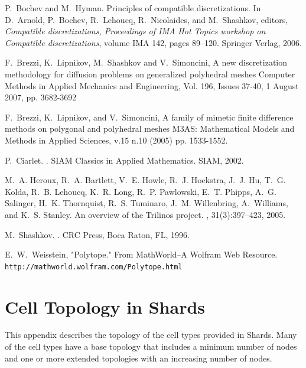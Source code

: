 \documentclass[pdf,12pt,relaxed]{SANDreport}
\begin{document}
\begin{thebibliography}{99}

P.~Bochev and M.~Hyman.
\newblock Principles of compatible discretizations.
\newblock In D.~Arnold, P.~Bochev, R.~Lehoucq, R.~Nicolaides, and M.~Shashkov,
  editors, {\em Compatible discretizations, Proceedings of IMA Hot Topics
  workshop on Compatible discretizations}, volume IMA 142, pages 89--120.
  Springer Verlag, 2006.


 F.~Brezzi, K.~Lipnikov, M.~Shashkov and V.~Simoncini,
\newblock A new discretization methodology for diffusion problems on generalized polyhedral meshes
Computer Methods in Applied Mechanics and Engineering, Vol. 196, Issues 37-40, 1 August 2007, pp. 3682-3692

 F.~Brezzi, K.~Lipnikov, and V.~Simoncini,
\newblock A family of mimetic finite difference methods on polygonal and polyhedral meshes
M3AS: Mathematical Models and Methods in Applied Sciences, v.15 n.10 (2005) pp. 1533-1552.

P.~Ciarlet.
.
\newblock SIAM Classics in Applied Mathematics. SIAM, 2002.


M.~A. Heroux, R.~A. Bartlett, V.~E. Howle, R.~J. Hoekstra, J.~J. Hu, T.~G.
  Kolda, R.~B. Lehoucq, K.~R. Long, R.~P. Pawlowski, E.~T. Phipps, A.~G.
  Salinger, H.~K. Thornquist, R.~S. Tuminaro, J.~M. Willenbring, A.~Williams,
  and K.~S. Stanley.
\newblock An overview of the {T}rilinos project.
, 31(3):397--423, 2005.

M.~Shashkov.
.
\newblock CRC Press, Boca Raton, FL, 1996.

 E.~W.~Weisstein,  "Polytope." From MathWorld--A Wolfram Web Resource. 
{\tt http://mathworld.wolfram.com/Polytope.html}

\end{thebibliography}




\appendix
\section{Cell Topology in Shards}

This appendix describes the topology of the cell types provided in Shards. Many of the cell types have a base topology that includes a minimum number of nodes and one or more extended topologies with an increasing number of nodes. 
\end{document}
